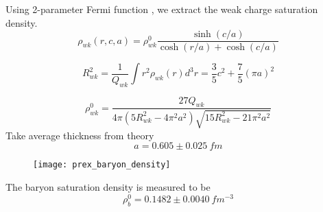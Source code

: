 Using 2-parameter Fermi function \cite{PhysRevC.102.044321}, we extract the 
weak charge saturation density.
\begin{equation}
    \rho_{wk}(r, c, a) = \rho^0_{wk} \frac{\sinh(c/a)}{\cosh(r/a) + \cosh(c/a)}
\end{equation}

\begin{equation}
    R^2_{wk} = \frac{1}{Q_{wk}}\int r^2 \rho_{wk}(r)d^3r = \frac{3}{5}c^2 + \frac{7}{5}(\pi a)^2
\end{equation}

\begin{equation}
    \rho^0_{wk} = \frac{27 Q_{{wk}}}{4\pi(5R^2_{wk} - 4\pi^2 a^2)\sqrt{15R^2_{wk} - 21\pi^2 a^2}}
\end{equation}
Take average thickness from theory
\begin{equation}
    a = 0.605 \pm 0.025\ fm
\end{equation}

\begin{figure}
    \centering
    \texttt{[image: prex\_baryon\_density]}
\end{figure}

The baryon saturation density is measured to be
\begin{equation}
    \rho^0_b = 0.1482 \pm 0.0040\ fm^{-3}
\end{equation}


\begin{comment}
\subsection{Atomic Parity Violation Asymmetry}
Accuracy of atomic PV measurement is about 0.3\% (FIXME), which is important
for the test of the SM and the search for physics beyond the SM. A higher (0.1\%)
precision requires knowledge about the neutron radius better than 1\%. \cite{PhysRevC.46.2587}

\subsection{Coherent Neutrino Scattering off Nucleus}
\begin{equation}
    \frac{d\sigma}{dT} \approx \frac{G_F^2 M}{2 \pi}\frac{Q^2_W}{4}F^2(Q)\left ( 2 - \frac{MT}{E_\nu^2} \right)
\end{equation}
where E is the neutrino energy and T is the nuclear recoil energy. M being the
nuclear mass and $Q=\sqrt{2MT}$ is the momentum transfer.

\begin{itemize}
    \item neutrino floor for dark matter searches
    \item high precision determination of nuclei allow coherent neutrino 
	scattering to probe non-standard neutrino interactions.
\end{itemize}
\end{comment}

